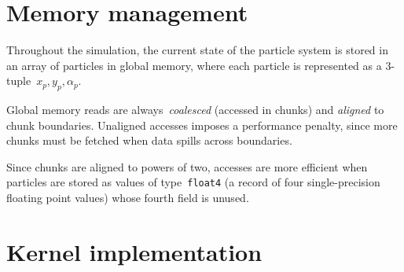 \section{Memory management}
\label{sec:memory-management}

Throughout the simulation,
the current state of the particle system
is stored in an array of particles in global memory,
where each particle is represented as a 3-tuple~\(x_p, y_p, α_p\).

Global memory reads are always~\emph{coalesced} (accessed in chunks)
and \emph{aligned} to chunk boundaries.
Unaligned accesses imposes a performance penalty,
since more chunks must be fetched
when data spills across boundaries.

Since chunks are aligned to powers of two,
accesses are more efficient when particles are stored
as values of type~\texttt{float4}
(a record of four single-precision floating point values)
whose fourth field is unused.

\section{Kernel implementation}
\label{sec:kernel-implementation}


